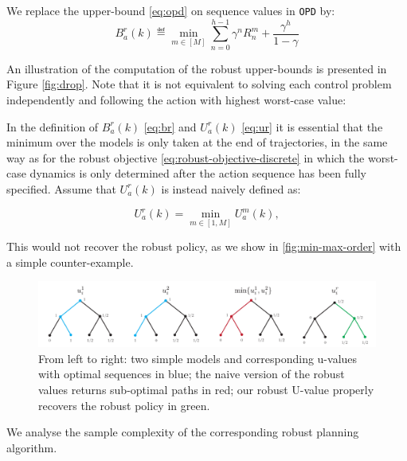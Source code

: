 \begin{definition}
	\begin{leftbar}[defnbar]
	We replace the upper-bound \eqref{eq:opd} on sequence values in \texttt{OPD} by:
	\begin{equation}
	\label{eq:robust-b-values}
	B_a^r(k)  \eqdef \min_{m\in[M]} \sum_{n=0}^{h-1} \gamma^n R_n^m  + \frac{\gamma^h}{1-\gamma}
	\end{equation}
	\end{leftbar}
\end{definition}
An illustration of the computation of the robust upper-bounds is presented in Figure \ref{fig:drop}. 
Note that it is not equivalent to solving each control problem independently and following the action with highest worst-case value:
\begin{remark}
	\label{sec:min-max-order}
	\begin{leftbar}[remarkbar]
	In the definition of $B_{a}^{r}(k)$ \eqref{eq:br} and $U_{a}^{r}(k)$ \eqref{eq:ur} it is essential that the minimum over the models is only taken at the end of trajectories, in the same way as for the robust objective \eqref{eq:robust-objective-discrete} in which the worst-case dynamics is only determined after the action sequence has been fully specified. Assume that $U_{a}^{r}(k)$ is instead naively defined as:
	
	\[
	U_{a}^{r}(k)=\min_{m\in[1,M]}U_{a}^{m}(k),
	\]
	
	This would not recover the robust policy, as we show in \autoref{fig:min-max-order} with a simple counter-example.
\end{leftbar}
	\begin{figure}[htp]
	\centering
	\includegraphics[width=\linewidth]{img/min-max-order}
	\caption{From left to right: two simple models and corresponding u-values with optimal sequences in blue; the naive version of the robust values returns sub-optimal paths in red; our robust U-value properly recovers the robust policy in green.}
	\label{fig:min-max-order}
	\end{figure}
\end{remark}

We analyse the sample complexity of the corresponding robust planning algorithm.

